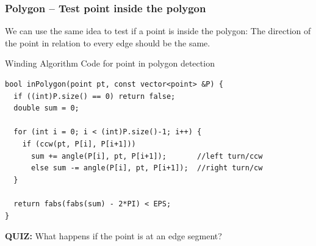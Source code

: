 \begin{frame}[fragile]
  \frametitle{Polygon -- Test point inside the polygon}

  We can use the same idea to test if a point is inside the polygon: The direction of the point in relation to every edge should be the same.

    {\smaller
    \begin{exampleblock}{Winding Algorithm Code for point in polygon detection}
\begin{verbatim}
bool inPolygon(point pt, const vector<point> &P) {
  if ((int)P.size() == 0) return false;
  double sum = 0;

  for (int i = 0; i < (int)P.size()-1; i++) {
    if (ccw(pt, P[i], P[i+1]))
      sum += angle(P[i], pt, P[i+1]);       //left turn/ccw
      else sum -= angle(P[i], pt, P[i+1]);  //right turn/cw
  }

  return fabs(fabs(sum) - 2*PI) < EPS;
}
\end{verbatim}
    \end{exampleblock}
  }

  {\bf QUIZ:} What happens if the point is at an edge segment?
\end{frame}

